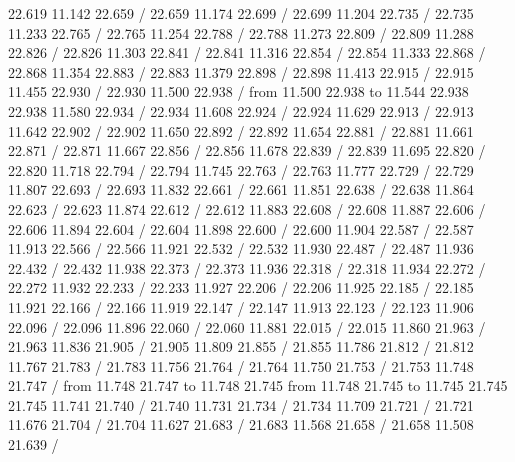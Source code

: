 {{ 22.619 11.142 22.659 /
 22.659 11.174 22.699 /
 22.699 11.204 22.735 /
 22.735 11.233 22.765 /
 22.765 11.254 22.788 /
 22.788 11.273 22.809 /
 22.809 11.288 22.826 /
 22.826 11.303 22.841 /
 22.841 11.316 22.854 /
 22.854 11.333 22.868 /
 22.868 11.354 22.883 /
 22.883 11.379 22.898 /
 22.898 11.413 22.915 /
 22.915 11.455 22.930 /
 22.930 11.500 22.938 /
\putrule from 11.500 22.938 to 11.544 22.938
 22.938 11.580 22.934 /
 22.934 11.608 22.924 /
 22.924 11.629 22.913 /
 22.913 11.642 22.902 /
 22.902 11.650 22.892 /
 22.892 11.654 22.881 /
 22.881 11.661 22.871 /
 22.871 11.667 22.856 /
 22.856 11.678 22.839 /
 22.839 11.695 22.820 /
 22.820 11.718 22.794 /
 22.794 11.745 22.763 /
 22.763 11.777 22.729 /
 22.729 11.807 22.693 /
 22.693 11.832 22.661 /
 22.661 11.851 22.638 /
 22.638 11.864 22.623 /
 22.623 11.874 22.612 /
 22.612 11.883 22.608 /
 22.608 11.887 22.606 /
 22.606 11.894 22.604 /
 22.604 11.898 22.600 /
 22.600 11.904 22.587 /
 22.587 11.913 22.566 /
 22.566 11.921 22.532 /
 22.532 11.930 22.487 /
 22.487 11.936 22.432 /
 22.432 11.938 22.373 /
 22.373 11.936 22.318 /
 22.318 11.934 22.272 /
 22.272 11.932 22.233 /
 22.233 11.927 22.206 /
 22.206 11.925 22.185 /
 22.185 11.921 22.166 /
 22.166 11.919 22.147 /
 22.147 11.913 22.123 /
 22.123 11.906 22.096 /
 22.096 11.896 22.060 /
 22.060 11.881 22.015 /
 22.015 11.860 21.963 /
 21.963 11.836 21.905 /
 21.905 11.809 21.855 /
 21.855 11.786 21.812 /
 21.812 11.767 21.783 /
 21.783 11.756 21.764 /
 21.764 11.750 21.753 /
 21.753 11.748 21.747 /
\putrule from 11.748 21.747 to 11.748 21.745
\putrule from 11.748 21.745 to 11.745 21.745
 21.745 11.741 21.740 /
 21.740 11.731 21.734 /
 21.734 11.709 21.721 /
 21.721 11.676 21.704 /
 21.704 11.627 21.683 /
 21.683 11.568 21.658 /
 21.658 11.508 21.639 /
}}
